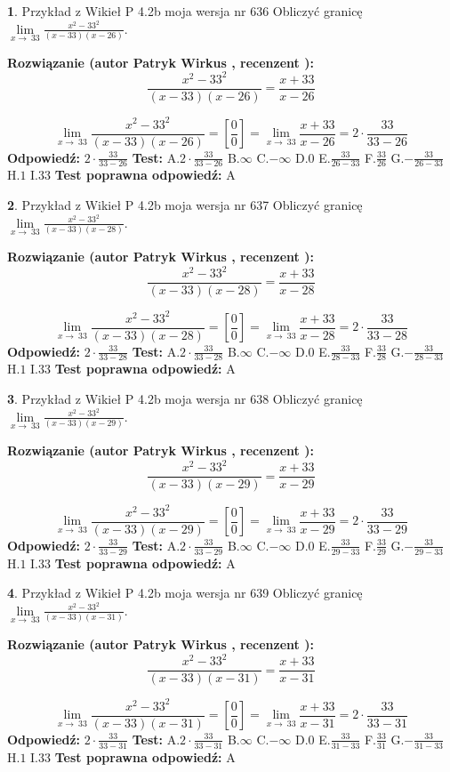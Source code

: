 \documentclass[12pt, a4paper]{article}
\theoremstyle{definition} %
\newtheorem{zad}{}
\newcommand{\zadStart}[1]{\begin{zad}#1\newline}
\newcommand{\zadStop}{\end{zad}}
\newcommand{\rozwStart}[2]{\noindent \textbf{Rozwiązanie (autor #1 , recenzent #2): }\newline}
\newcommand{\rozwStop}{\newline}
\newcommand{\odpStart}{\noindent \textbf{Odpowiedź:}\newline}
\newcommand{\odpStop}{\newline}
\newcommand{\testStart}{\noindent \textbf{Test:}\newline}
\newcommand{\testStop}{\newline}
\newcommand{\kluczStart}{\noindent \textbf{Test poprawna odpowiedź:}\newline}
\newcommand{\kluczStop}{\newline}
\begin{document}
\zadStart{Przykład z Wikieł P 4.2b moja wersja nr 636}
Obliczyć granicę $\lim\limits_{x\to\ 33}\frac{x^{2}-33^{2}}{(x-33)(x-26)}$.
\zadStop
\rozwStart{Patryk Wirkus}{}
$$\frac{x^{2}-33^{2}}{(x-33)(x-26)}=\frac{x+33}{x-26}$$

$$\lim\limits_{x\to\ 33}\frac{x^{2}-33^{2}}{(x-33)(x-26)}=[\frac{0}{0}]=\lim\limits_{x\to\ 33}\frac{x+33}{x-26}=2 \cdot \frac{33}{33-26}$$
\rozwStop
\odpStart
$2 \cdot \frac{33}{33-26}$
\odpStop
\testStart
A.$2 \cdot \frac{33}{33-26}$
B.$\infty$
C.$-\infty$
D.$0$
E.$\frac{33}{26-33}$
F.$\frac{33}{26}$
G.$-\frac{33}{26-33}$
H.$1$
I.$33$
\testStop
\kluczStart
A
\kluczStop



\zadStart{Przykład z Wikieł P 4.2b moja wersja nr 637}
Obliczyć granicę $\lim\limits_{x\to\ 33}\frac{x^{2}-33^{2}}{(x-33)(x-28)}$.
\zadStop
\rozwStart{Patryk Wirkus}{}
$$\frac{x^{2}-33^{2}}{(x-33)(x-28)}=\frac{x+33}{x-28}$$

$$\lim\limits_{x\to\ 33}\frac{x^{2}-33^{2}}{(x-33)(x-28)}=[\frac{0}{0}]=\lim\limits_{x\to\ 33}\frac{x+33}{x-28}=2 \cdot \frac{33}{33-28}$$
\rozwStop
\odpStart
$2 \cdot \frac{33}{33-28}$
\odpStop
\testStart
A.$2 \cdot \frac{33}{33-28}$
B.$\infty$
C.$-\infty$
D.$0$
E.$\frac{33}{28-33}$
F.$\frac{33}{28}$
G.$-\frac{33}{28-33}$
H.$1$
I.$33$
\testStop
\kluczStart
A
\kluczStop



\zadStart{Przykład z Wikieł P 4.2b moja wersja nr 638}
Obliczyć granicę $\lim\limits_{x\to\ 33}\frac{x^{2}-33^{2}}{(x-33)(x-29)}$.
\zadStop
\rozwStart{Patryk Wirkus}{}
$$\frac{x^{2}-33^{2}}{(x-33)(x-29)}=\frac{x+33}{x-29}$$

$$\lim\limits_{x\to\ 33}\frac{x^{2}-33^{2}}{(x-33)(x-29)}=[\frac{0}{0}]=\lim\limits_{x\to\ 33}\frac{x+33}{x-29}=2 \cdot \frac{33}{33-29}$$
\rozwStop
\odpStart
$2 \cdot \frac{33}{33-29}$
\odpStop
\testStart
A.$2 \cdot \frac{33}{33-29}$
B.$\infty$
C.$-\infty$
D.$0$
E.$\frac{33}{29-33}$
F.$\frac{33}{29}$
G.$-\frac{33}{29-33}$
H.$1$
I.$33$
\testStop
\kluczStart
A
\kluczStop



\zadStart{Przykład z Wikieł P 4.2b moja wersja nr 639}
Obliczyć granicę $\lim\limits_{x\to\ 33}\frac{x^{2}-33^{2}}{(x-33)(x-31)}$.
\zadStop
\rozwStart{Patryk Wirkus}{}
$$\frac{x^{2}-33^{2}}{(x-33)(x-31)}=\frac{x+33}{x-31}$$

$$\lim\limits_{x\to\ 33}\frac{x^{2}-33^{2}}{(x-33)(x-31)}=[\frac{0}{0}]=\lim\limits_{x\to\ 33}\frac{x+33}{x-31}=2 \cdot \frac{33}{33-31}$$
\rozwStop
\odpStart
$2 \cdot \frac{33}{33-31}$
\odpStop
\testStart
A.$2 \cdot \frac{33}{33-31}$
B.$\infty$
C.$-\infty$
D.$0$
E.$\frac{33}{31-33}$
F.$\frac{33}{31}$
G.$-\frac{33}{31-33}$
H.$1$
I.$33$
\testStop
\kluczStart
A
\kluczStop
\end{document}
